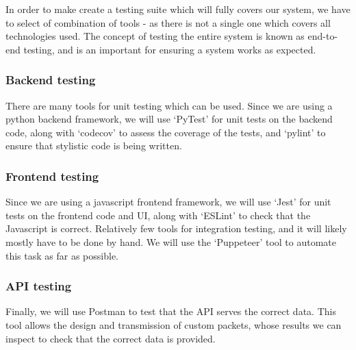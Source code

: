 \documentclass[10pt]{article}
\begin{document}
In order to make create a testing suite which will fully covers our system, we
have to select of combination of tools - as there is not a single one which
covers all technologies used. The concept of testing the entire system is known
as end-to-end testing, and is an important for ensuring a system works as
expected.

\subsubsection{Backend testing}
There are many tools for unit testing which can be used. Since we are using a
python backend framework, we will use `PyTest' \cite{Pytest} for unit tests on
the backend code, along with `codecov' \cite{Codecov} to assess the coverage of
the tests, and `pylint' \cite{Pylint} to ensure that stylistic code is being
written.

\subsubsection{Frontend testing}
Since we are using a javascript frontend framework, we will use `Jest'
\cite{Jest} for unit tests on the frontend code and UI, along with `ESLint'
\cite{ESLint} to check that the Javascript is correct. Relatively few tools for
integration testing, and it will likely mostly have to be done by hand. We will
use the `Puppeteer' \cite{Puppeteer} tool to automate this task as far as
possible.

\subsubsection{API testing}
Finally, we will use Postman \cite{Postman} to test that the API serves the
correct data. This tool allows the design and transmission of custom packets,
whose results we can inspect to check that the correct data is provided.

\pagebreak

\nocite{*}


\end{document}
